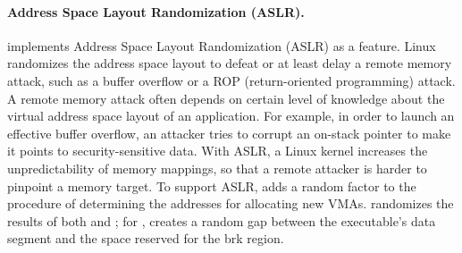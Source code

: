 \paragraph{Address Space Layout Randomization (ASLR).}

\thelibos{} implements Address Space Layout Randomization (ASLR) as a \libos{} feature.
Linux randomizes the address space layout to defeat or at least delay a remote memory attack, such as
a buffer overflow or a ROP (return-oriented programming) attack.
A remote memory attack
often depends on certain level of knowledge about the virtual address space layout of an application.
For example, in order to launch an effective buffer overflow,
an attacker tries to corrupt an on-stack pointer to make it points to security-sensitive data.
With ASLR, a Linux kernel increases the unpredictability of memory mappings,
so that a remote attacker is harder
to pinpoint a memory target.
To support ASLR,
\thelibos{} adds a random factor to the procedure of determining the addresses for allocating new VMAs.
\thelibos{} randomizes the results of both  and ;
for , \thelibos{} creates a random gap between the executable's data segment and the space reserved for the brk region.






